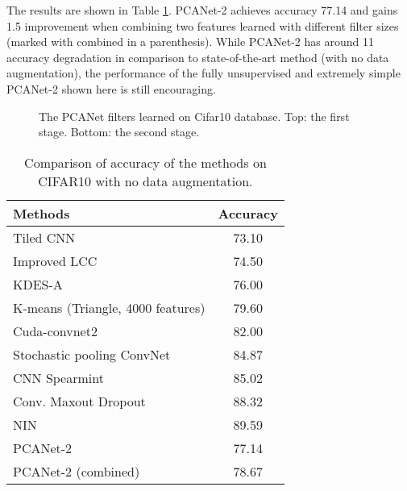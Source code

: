 \documentclass[10pt,journal,compsoc]{IEEEtran}
\begin{document}
The results are shown in Table \ref{table: cifar10}. PCANet-2 achieves accuracy 77.14 and gains 1.5 improvement when combining two features learned with different filter sizes (marked with combined in a parenthesis). While PCANet-2 has around 11 accuracy degradation in comparison to state-of-the-art method (with no data augmentation), the performance of the fully unsupervised and extremely simple PCANet-2 shown here is still encouraging.


\begin{figure}[t]
\centering
{}
\caption{The PCANet filters learned on Cifar10 database. Top: the first stage. Bottom: the second stage. }\label{fig: cifar10_filters}
\end{figure}

\begin{table}[tbp]\centering
\caption{Comparison of accuracy  of the methods on CIFAR10 with no data augmentation.}
\begin{tabular}{l|c}
  \hline
Methods         &  Accuracy   \\  \hline \hline
  Tiled CNN \cite{Le2010} & 73.10 \\
  Improved LCC \cite{Yu2010} & 74.50 \\
  KDES-A \cite{Bo2010} & 76.00 \\
  K-means (Triangle, 4000 features) \cite{Coates2010} & 79.60 \\
  Cuda-convnet2 \cite{Krizhevsky2014} & 82.00 \\
  Stochastic pooling ConvNet \cite{Zeiler2013} & 84.87   \\
  CNN  Spearmint \cite{Snoek2012} & 85.02 \\
  Conv. Maxout  Dropout \cite{Goodfellow2013} & 88.32   \\
  NIN \cite{Lin2014}  & 89.59      \\  \hline
  PCANet-2  & 77.14  \\
  PCANet-2 (combined) & 78.67 \\
  \hline
\end{tabular}\label{table: cifar10}
\end{table}
\end{document}
